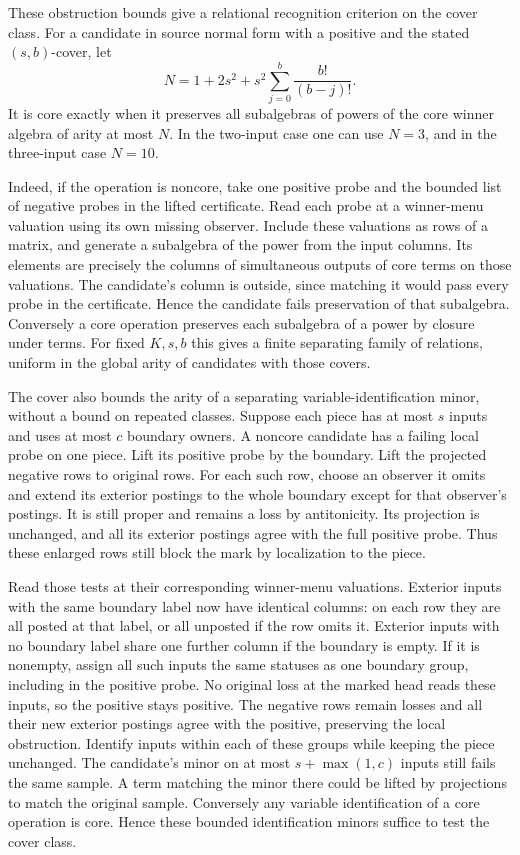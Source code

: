 These obstruction bounds give a relational
recognition criterion on the cover class.
For a candidate in source normal form with
a positive and the stated $(s,b)$-cover, let
\[
 N=1+2s^2+s^2\sum_{j=0}^{b}\frac{b!}{(b-j)!}.
\]
It is core exactly when it preserves all
subalgebras of powers of the core winner
algebra of arity at most $N$. In the
two-input case one can use $N=3$, and in
the three-input case $N=10$.

Indeed, if the operation is noncore, take
one positive probe and the bounded list
of negative probes in the lifted certificate.
Read each probe at a winner-menu valuation
using its own missing observer. Include
these valuations as rows of a matrix,
and generate a subalgebra of the power
from the input columns. Its elements
are precisely the columns of simultaneous
outputs of core terms on those valuations.
The candidate's column is outside,
since matching it would pass every
probe in the certificate. Hence the
candidate fails preservation of that
subalgebra. Conversely a core operation
preserves each subalgebra of a power
by closure under terms. For fixed $K,s,b$
this gives a finite separating family
of relations, uniform in the global arity
of candidates with those covers.

The cover also bounds the arity of a separating
variable-identification minor, without a bound
on repeated classes. Suppose each piece has
at most $s$ inputs and uses at most $c$
boundary owners. A noncore candidate has a
failing local probe on one piece. Lift its
positive probe by the boundary. Lift the
projected negative rows to original rows.
For each such row, choose an observer it
omits and extend its exterior postings to
the whole boundary except for that observer's
postings. It is still proper and remains a
loss by antitonicity. Its projection is
unchanged, and all its exterior postings
agree with the full positive probe. Thus
these enlarged rows still block the mark
by localization to the piece.

Read those tests at their corresponding
winner-menu valuations. Exterior inputs
with the same boundary label now have
identical columns: on each row they
are all posted at that label, or all
unposted if the row omits it. Exterior
inputs with no boundary label share
one further column if the boundary
is empty. If it is nonempty, assign
all such inputs the same statuses as
one boundary group, including in the
positive probe. No original loss at
the marked head reads these inputs,
so the positive stays positive.
The negative rows remain losses and
all their new exterior postings agree
with the positive, preserving the
local obstruction. Identify inputs
within each of these groups while
keeping the piece unchanged. The
candidate's minor on at most $s+\max(1,c)$
inputs still fails the same sample.
A term matching the minor there
could be lifted by projections to
match the original sample. Conversely
any variable identification of a core
operation is core. Hence these bounded
identification minors suffice to test
the cover class.

